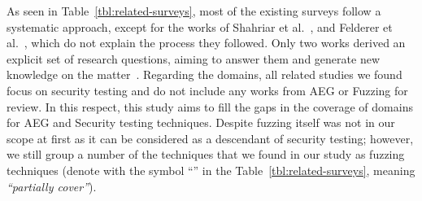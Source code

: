 As seen in Table~\ref{tbl:related-surveys}, most of the existing surveys follow a systematic approach, except for the works of Shahriar et al.~\cite{shahriar2009automatic}, and Felderer et al.~\cite{felderer2016security}, which do not explain the process they followed.
Only two works derived an explicit set of research questions, aiming to answer them and generate new knowledge on the matter~\cite{aydos2022security, ahsan2024systematic}.
{}
{}
Regarding the domains, all related studies we found focus on security testing and do not include any works from AEG or Fuzzing for review. 
%
In this respect, this study aims to fill the gaps in the coverage of domains for AEG and Security testing techniques.
{}
{}
Despite fuzzing itself was not in our scope at first as it can be considered as a descendant of security testing; however, we still group a number of the techniques that we found in our study as fuzzing techniques (denote with the symbol ``'' in the Table~\ref{tbl:related-surveys}, meaning \textit{``partially cover''}).

